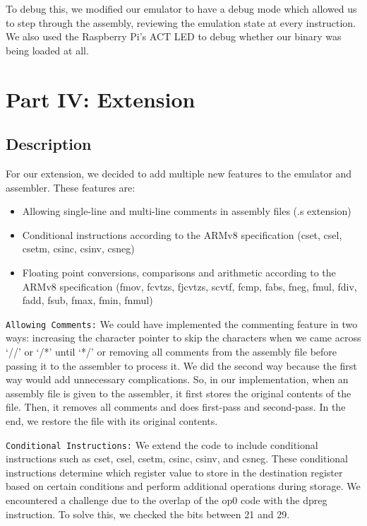 \documentclass[11pt]{article}
\begin{document}
To debug this, we modified our emulator to have a debug mode which allowed us to step through the assembly, reviewing the emulation state at every instruction. We also used the Raspberry Pi’s ACT LED to debug whether our binary was being loaded at all.


\section{Part IV: Extension}
\subsection{Description}
For our extension, we decided to add multiple new features to the emulator and assembler. These features are:
\begin{itemize}
    \item Allowing single-line and multi-line comments in assembly files (.s extension)
    \item Conditional instructions according to the ARMv8 specification (cset, csel, csetm, csinc, csinv, csneg)
    \item Floating point conversions, comparisons and arithmetic according to the ARMv8 specification (fmov, fcvtzs, fjcvtzs, scvtf, fcmp, fabs, fneg, fmul, fdiv, fadd, fsub, fmax, fmin, fnmul)
\end{itemize}

\verb|Allowing Comments:| We could have implemented the commenting feature in two ways: increasing the character pointer to skip the characters when we came across ‘//’ or ‘/*’ until ‘*/’ or removing all comments from the assembly file before passing it to the assembler to process it. We did the second way because the first way would add unnecessary complications. So, in our implementation, when an assembly file is given to the assembler, it first stores the original contents of the file. Then, it removes all comments and does first-pass and second-pass. In the end, we restore the file with its original contents.

\verb|Conditional Instructions:| We extend the code to include conditional instructions such as cset, csel, csetm, csinc, csinv, and csneg. These conditional instructions determine which register value to store in the destination register based on certain conditions and perform additional operations during storage. We encountered a challenge due to the overlap of the op0 code with the dpreg instruction. To solve this, we checked the bits between 21 and 29. 
\end{document}
